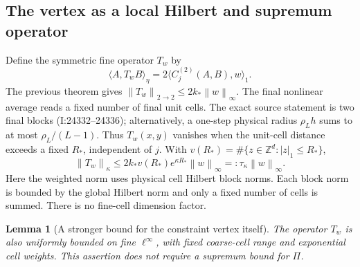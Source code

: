 \documentclass[11pt]{article}
\newtheorem{lemma}[theorem]{Lemma}
\theoremstyle{remark}
\newcommand{\norm}[1]{\left\|#1\right\|}
\begin{document}
\subsection{The vertex as a local Hilbert and supremum operator}
\label{fc-vertex-norm-section}

Define the symmetric fine operator $T_w$ by
\begin{equation}
 \langle A,T_wB\rangle_\eta
       =2\langle C_j^{(2)}(A,B),w\rangle_1.
 \label{fc-T-definition}
\end{equation}
The previous theorem gives
$\norm{T_w}_{2\to2}\le2k_*\norm{w}_\infty$.
The final nonlinear average reads a fixed number of final unit
cells. The exact source statement is two final blocks
(I:24332--24336); alternatively, a one-step physical radius
$\rho_Lh$ sums to at most $\rho_L/(L-1)$. Thus $T_w(x,y)$ vanishes
when the unit-cell distance exceeds a fixed $R_*$, independent of
$j$. With $v(R_*)=\#\{z\in\mathbb Z^d:|z|_1\le R_*\}$,
\begin{equation}
 \norm{T_w}_\kappa\le
  2k_*v(R_*)e^{\kappa R_*}\norm{w}_\infty
  =:\tau_\kappa\norm{w}_\infty.
 \label{fc-T-weighted}
\end{equation}
Here the weighted norm uses physical cell Hilbert block norms.
Each block norm is bounded by the global Hilbert norm and only a
fixed number of cells is summed. There is no fine-cell dimension
factor.

\begin{lemma}[A stronger bound for the constraint vertex itself]
\label{fc-T-supremum}
The operator $T_w$ is also uniformly bounded on fine
$\ell^\infty$, with fixed coarse-cell range and exponential cell
weights. This assertion does not require a supremum bound for
$\Pi$.
\end{lemma}
\end{document}
